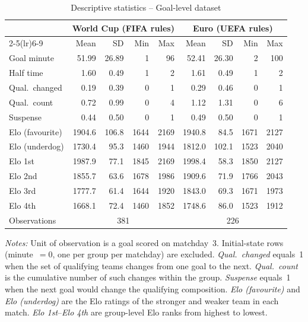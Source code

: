 \begin{table}[H]
\centering
\caption{Descriptive statistics -- Goal-level dataset}
\label{tab:desc_stats_goals}
\begin{threeparttable}
\begin{tabular}{lrrrrrrrr}
\toprule
 & \multicolumn{4}{c}{World Cup (FIFA rules)} & \multicolumn{4}{c}{Euro (UEFA rules)} \\
\cmidrule(lr){2-5}\cmidrule(lr){6-9}
 & Mean & SD & Min & Max & Mean & SD & Min & Max \\
\midrule
Goal minute        & 51.99 & 26.89 &  1 &  96 & 52.41 & 26.30 &  2 & 100 \\
Half time          &  1.60 &  0.49 &  1 &   2 &  1.61 &  0.49 &  1 &   2 \\
Qual.\ changed     &  0.19 &  0.39 &  0 &   1 &  0.29 &  0.46 &  0 &   1 \\
Qual.\ count       &  0.72 &  0.99 &  0 &   4 &  1.12 &  1.31 &  0 &   6 \\
Suspense           &  0.44 &  0.50 &  0 &   1 &  0.49 &  0.50 &  0 &   1 \\
Elo (favourite)    & 1904.6 & 106.8 & 1644 & 2169 & 1940.8 &  84.5 & 1671 & 2127 \\
Elo (underdog)     & 1730.4 &  95.3 & 1460 & 1944 & 1812.0 & 102.1 & 1523 & 2040 \\
Elo 1st            & 1987.9 &  77.1 & 1845 & 2169 & 1998.4 &  58.3 & 1850 & 2127 \\
Elo 2nd            & 1855.7 &  63.6 & 1678 & 1986 & 1909.6 &  71.9 & 1766 & 2043 \\
Elo 3rd            & 1777.7 &  61.4 & 1644 & 1920 & 1843.0 &  69.3 & 1671 & 1973 \\
Elo 4th            & 1668.1 &  72.4 & 1460 & 1852 & 1748.6 &  86.0 & 1523 & 1912 \\
\midrule
Observations       & \multicolumn{4}{c}{381} & \multicolumn{4}{c}{226} \\
\bottomrule
\end{tabular}
\begin{tablenotes}
\small
\item \textit{Notes:} Unit of observation is a goal scored on matchday~3. Initial-state rows (minute~$= 0$, one per group per matchday) are excluded. \textit{Qual.\ changed} equals~1 when the set of qualifying teams changes from one goal to the next. \textit{Qual.\ count} is the cumulative number of such changes within the group. \textit{Suspense} equals~1 when the next goal would change the qualifying composition. \textit{Elo (favourite)} and \textit{Elo (underdog)} are the Elo ratings of the stronger and weaker team in each match. \textit{Elo 1st}--\textit{Elo 4th} are group-level Elo ranks from highest to lowest.
\end{tablenotes}
\end{threeparttable}
\end{table}
